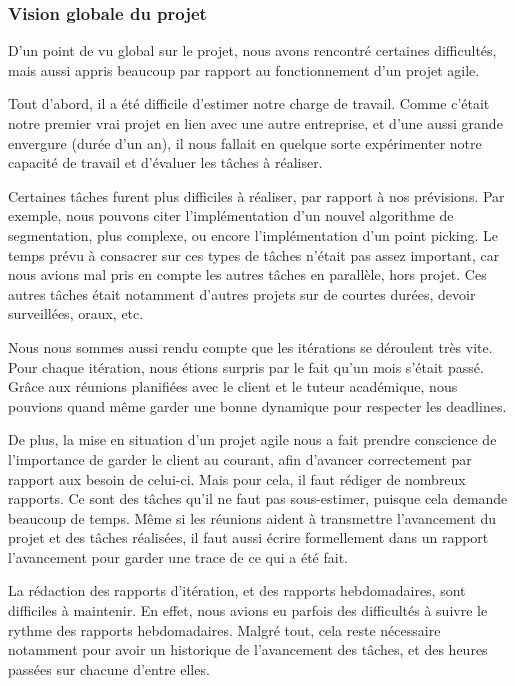 \documentclass[12pt,titlepage,french]{article}
\begin{document}
\subsubsection{Vision globale du projet}

D'un point de vu global sur le projet, nous avons rencontré certaines difficultés, mais aussi appris beaucoup par rapport au fonctionnement d'un projet agile. \newline

Tout d'abord, il a été difficile d'estimer notre charge de travail. Comme c'était notre premier vrai projet en lien avec une autre entreprise, et d'une aussi grande envergure (durée d'un an), il nous fallait en quelque sorte expérimenter notre capacité de travail et d'évaluer les tâches à réaliser. \newline

Certaines tâches furent plus difficiles à réaliser, par rapport à nos prévisions. Par exemple, nous pouvons citer l'implémentation d'un nouvel algorithme de segmentation, plus complexe, ou encore l'implémentation d'un point picking. Le temps prévu à consacrer sur ces types de tâches n'était pas assez important, car nous avions mal pris en compte les autres tâches en parallèle, hors projet. Ces autres tâches était notamment d'autres projets sur de courtes durées, devoir surveillées, oraux, etc. \newline

Nous nous sommes aussi rendu compte que les itérations se déroulent très vite. Pour chaque itération, nous étions surpris par le fait qu'un mois s'était passé. Grâce aux réunions planifiées avec le client et le tuteur académique, nous pouvions quand même garder une bonne dynamique pour respecter les deadlines. \newline

De plus, la mise en situation d'un projet agile nous a fait prendre conscience de l'importance de garder le client au courant, afin d'avancer correctement par rapport aux besoin de celui-ci. Mais pour cela, il faut rédiger de nombreux rapports. Ce sont des tâches qu'il ne faut pas sous-estimer, puisque cela demande beaucoup de temps. Même si les réunions aident à transmettre l'avancement du projet et des tâches réalisées, il faut aussi écrire formellement dans un rapport l'avancement pour garder une trace de ce qui a été fait. \newline

La rédaction des rapports d'itération, et des rapports hebdomadaires, sont difficiles à maintenir. En effet, nous avions eu parfois des difficultés à suivre le rythme des rapports hebdomadaires. Malgré tout, cela reste nécessaire notamment pour avoir un historique de l'avancement des tâches, et des heures passées sur chacune d'entre elles.
\end{document}
